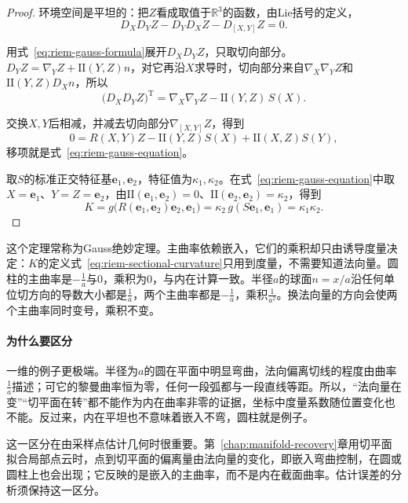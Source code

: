 \begin{proof}
环境空间是平坦的：把$Z$看成取值于$\mathbb R^3$的函数，由Lie括号的定义，
\[
D_XD_YZ-D_YD_XZ-D_{[X,Y]}Z=0 .
\]

用式~\eqref{eq:riem-gauss-formula}展开$D_XD_YZ$，只取切向部分。$D_YZ=\nabla_YZ+\mathrm{II}(Y,Z)n$，对它再沿$X$求导时，切向部分来自$\nabla_X\nabla_YZ$和$\mathrm{II}(Y,Z)D_Xn$，所以
\[
\bigl(D_XD_YZ\bigr)^{\mathrm T}=\nabla_X\nabla_YZ-\mathrm{II}(Y,Z)\,S(X).
\]

交换$X,Y$后相减，并减去切向部分$\nabla_{[X,Y]}Z$，得到
\[
0=R(X,Y)Z-\mathrm{II}(Y,Z)S(X)+\mathrm{II}(X,Z)S(Y),
\]
移项就是式~\eqref{eq:riem-gauss-equation}。

取$S$的标准正交特征基$\bm e_1,\bm e_2$，特征值为$\kappa_1,\kappa_2$。在式~\eqref{eq:riem-gauss-equation}中取$X=\bm e_1$、$Y=Z=\bm e_2$，由$\mathrm{II}(\bm e_1,\bm e_2)=0$、$\mathrm{II}(\bm e_2,\bm e_2)=\kappa_2$，得到
\[
K=g\bigl(R(\bm e_1,\bm e_2)\bm e_2,\bm e_1\bigr)=\kappa_2\,g(S\bm e_1,\bm e_1)=\kappa_1\kappa_2 .
\]
\end{proof}

这个定理常称为Gauss绝妙定理。主曲率依赖嵌入，它们的乘积却只由诱导度量决定：$K$的定义式~\eqref{eq:riem-sectional-curvature}只用到度量，不需要知道法向量。圆柱的主曲率是$-\tfrac1a$与$0$，乘积为$0$，与内在计算一致。半径$a$的球面$n=x/a$沿任何单位切方向的导数大小都是$\tfrac1a$，两个主曲率都是$-\tfrac1a$，乘积$\tfrac1{a^2}$。换法向量的方向会使两个主曲率同时变号，乘积不变。

\paragraph{为什么要区分}
一维的例子更极端。半径为$a$的圆在平面中明显弯曲，法向偏离切线的程度由曲率$\tfrac1a$描述；可它的黎曼曲率恒为零，任何一段弧都与一段直线等距。所以，“法向量在变”“切平面在转”都不能作为内在曲率非零的证据，坐标中度量系数随位置变化也不能。反过来，内在平坦也不意味着嵌入不弯，圆柱就是例子。

这一区分在由采样点估计几何时很重要。第~\ref{chap:manifold-recovery}章用切平面拟合局部点云时，点到切平面的偏离量由法向量的变化，即嵌入弯曲控制，在圆或圆柱上也会出现；它反映的是嵌入的主曲率，而不是内在截面曲率。估计误差的分析须保持这一区分。
